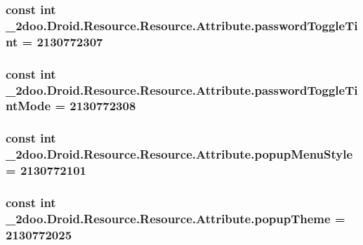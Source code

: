 \hypertarget{class__2doo_1_1_droid_1_1_resource_1_1_attribute_90beb43764a8f7dd72e0b7cebf8faa6c}{
\subsubsection[{passwordToggleTint}]{\setlength{\rightskip}{0pt plus 5cm}const int \_\-2doo.Droid.Resource.Resource.Attribute.passwordToggleTint = 2130772307}}
\label{class__2doo_1_1_droid_1_1_resource_1_1_attribute_90beb43764a8f7dd72e0b7cebf8faa6c}


\hypertarget{class__2doo_1_1_droid_1_1_resource_1_1_attribute_98e71a3a6a4fe00ed94285dea34dc731}{
\subsubsection[{passwordToggleTintMode}]{\setlength{\rightskip}{0pt plus 5cm}const int \_\-2doo.Droid.Resource.Resource.Attribute.passwordToggleTintMode = 2130772308}}
\label{class__2doo_1_1_droid_1_1_resource_1_1_attribute_98e71a3a6a4fe00ed94285dea34dc731}


\hypertarget{class__2doo_1_1_droid_1_1_resource_1_1_attribute_48f0124209d30f97034a10ca05f2b502}{
\subsubsection[{popupMenuStyle}]{\setlength{\rightskip}{0pt plus 5cm}const int \_\-2doo.Droid.Resource.Resource.Attribute.popupMenuStyle = 2130772101}}
\label{class__2doo_1_1_droid_1_1_resource_1_1_attribute_48f0124209d30f97034a10ca05f2b502}


\hypertarget{class__2doo_1_1_droid_1_1_resource_1_1_attribute_bd68c11fe17c46d5ad70236ecd203952}{
\subsubsection[{popupTheme}]{\setlength{\rightskip}{0pt plus 5cm}const int \_\-2doo.Droid.Resource.Resource.Attribute.popupTheme = 2130772025}}
\label{class__2doo_1_1_droid_1_1_resource_1_1_attribute_bd68c11fe17c46d5ad70236ecd203952}


